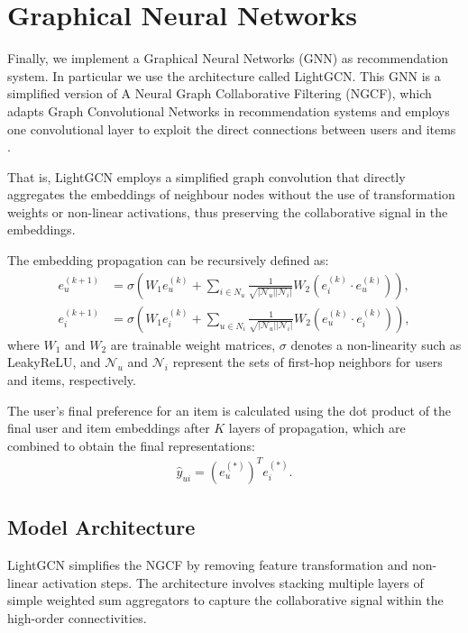 \documentclass[12pt]{article}
\numberwithin{equation}{section}
\begin{document}
\section{Graphical Neural Networks}

Finally, we implement a Graphical Neural Networks (GNN) as recommendation system. In particular we use the architecture called LightGCN. This GNN is a simplified version of A Neural Graph Collaborative Filtering (NGCF), which adapts Graph Convolutional Networks in recommendation systems and employs one convolutional layer to exploit the direct connections between users and items \cite{lightgcn}. 

That is, LightGCN employs a simplified graph convolution that directly aggregates the embeddings of neighbour nodes without the use of transformation weights or non-linear activations, thus preserving the collaborative signal in the embeddings.

The embedding propagation can be recursively defined as:
\begin{align*}
	e_u^{(k+1)} &= \sigma \left( W_1 e_u^{(k)} + \sum_{i \in N_u} \frac{1}{\sqrt{|\mathcal{N}_u||\mathcal{N}_i|}} W_2 (e_i^{(k)} \cdot e_u^{(k)}) \right), \\
	e_i^{(k+1)} &= \sigma \left( W_1 e_i^{(k)} + \sum_{u \in N_i} \frac{1}{\sqrt{|\mathcal{N}_u||\mathcal{N}_i|}} W_2 (e_u^{(k)} \cdot e_i^{(k)}) \right),
\end{align*}
where $W_1$ and $W_2$ are trainable weight matrices, $\sigma$ denotes a non-linearity such as LeakyReLU, and $\mathcal{N}_u$ and $\mathcal{N}_i$ represent the sets of first-hop neighbors for users and items, respectively.

The user's final preference for an item is calculated using the dot product of the final user and item embeddings after $K$ layers of propagation, which are combined to obtain the final representations:
\begin{align*}
	\hat{y}_{ui} = (e_u^{(*)})^T e_i^{(*)}.
\end{align*}


\subsection{Model Architecture}

LightGCN simplifies the NGCF by removing feature transformation and non-linear activation steps. The architecture involves stacking multiple layers of simple weighted sum aggregators to capture the collaborative signal within the high-order connectivities.
\end{document}
